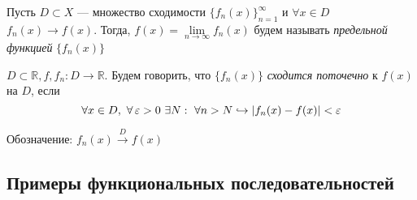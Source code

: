 \documentclass[a4paper, 10pt]{article}
\begin{document}
 Пусть $D\subset X$ — множество сходимости $\{f_n(x)\}_{n=1}^{\infty}$ и $\forall x\in D$ $f_n(x)\rightarrow f(x)$. Тогда, $f(x)=\lim\limits_{n\to\infty} f_n(x)$ будем называть \textit{предельной функцией} $\{f_n(x)\}$

 $D\subset \mathbb{R}, f,f_n:D\rightarrow\mathbb{R}$. Будем говорить, что $\{f_n(x)\}$ \textit{сходится поточечно} к $f(x)$ на $D$, если 
\begin{equation*}
    \forall x\in D,\ \forall\ve >0\ \exists N:\ \forall n>N\hookrightarrow|f_n(x)-f(x)|<\ve
\end{equation*}

Обозначение: $f_n(x)\overset{D}{\longrightarrow}f(x)$

\subsection{Примеры функциональных последовательностей}
\end{document}
